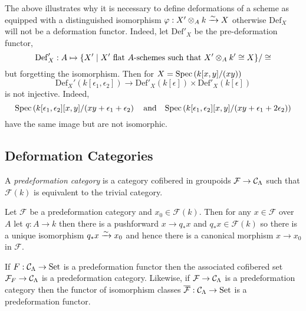 \documentclass[12pt]{article}
\newcommand{\Set}{\mathrm{Set}}
\newcommand{\Def}{\mathrm{Def}}
\renewcommand{\F}{\mathcal{F}}
\begin{document}
\begin{rmk}
The above illustrates why it is necessary to define deformations of a scheme as equipped with a distinguished isomorphism $\varphi : X' \otimes_A k \xrightarrow{\sim} X$ otherwise $\Def_X$ will not be a deformation functor. Indeed, let $\Def'_X$ be the pre-deformation functor,
\[ \Def'_X : A \mapsto \{ X' \mid X' \text{ flat } A\text{-schemes such that } X' \ot_A k' \cong X \} / \cong \]
but forgetting the isomorphism. Then for $X = \mathrm{Spec}\left( k[x,y]/(xy) \right)$
\[ \Def_X'(k[\epsilon_1, \epsilon_2]) \to \Def'_X(k[\epsilon]) \times \Def'_X(k[\epsilon]) \]
is not injective. Indeed,  
\[ \mathrm{Spec}\left( k[\epsilon_1, \epsilon_2][x,y]/(xy + \epsilon_1 + \epsilon_2 \right) \quad \text{and} \quad \mathrm{Spec}\left( k[\epsilon_1, \epsilon_2][x,y]/(xy + \epsilon_1 + 2 \epsilon_2) \right) \]  
have the same image but are not isomorphic. 
\end{rmk}


\subsection{Deformation Categories}

\begin{defn}
A \textit{predeformation category} is a category cofibered in groupoids $\F \to \C_{\Lambda}$ such that $\F(k)$ is equivalent to the trivial category. 
\end{defn}

\begin{rmk}
Let $\F$ be a predeformation category and $x_0 \in \F(k)$. Then for any $x \in \F$ over $A$ let $q : A \to k$ then there is a pushforward $x \to q_* x$ and $q_* x \in \F(k)$ so there is a unique isomorphism $q_* x \xrightarrow{\sim} x_0$ and hence there is a canonical morphism $x \to x_0$ in $\F$. 
\end{rmk}

\begin{rmk}
If $F : \C_\Lambda \to \Set$ is a predeformation functor then the associated cofibered set $\F_F \to \C_{\Lambda}$ is a predeformation category. Likewise, if $\F \to \C_\Lambda$ is a predeformation category then the functor of isomorphism classes $\overline{\F} : \C_{\Lambda} \to \Set$ is a predeformation functor. 
\end{rmk}
\end{document}
